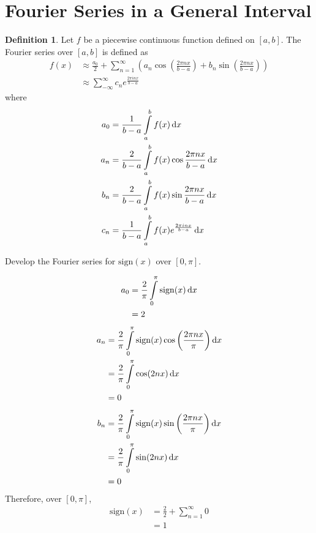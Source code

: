 \documentclass[fleqn, a4paper, 12pt, twoside]{article}
\theoremstyle{definition}
\newtheorem{definition}{Definition}
\theoremstyle{theorem}
\begin{document}
\section{Fourier Series in a General Interval}

\begin{definition}
	Let $f$ be a piecewise continuous function defined on $[a,b]$.
	The Fourier series over $[a,b]$ is defined as
	\begin{align*}
		f(x) & \approx \frac{a_0}{2} + \sum\limits_{n = 1}^{\infty} \left( a_n \cos\left( \frac{2 \pi n x}{b - a} \right) + b_n \sin\left( \frac{2 \pi n x}{b - a} \right) \right) \\
                     & \approx \sum\limits_{-\infty}^{\infty} c_n e^{\frac{2 \pi i n x}{b - a}}
	\end{align*}
	where
	\begin{align*}
		a_0 & = \frac{1}{b - a} \int\limits_{a}^{b} f(x) \dif x                              \\
		a_n & = \frac{2}{b - a} \int\limits_{a}^{b} f(x) \cos \frac{2 \pi n x}{b - a} \dif x \\
		b_n & = \frac{2}{b - a} \int\limits_{a}^{b} f(x) \sin \frac{2 \pi n x}{b - a} \dif x \\
		c_n & = \frac{1}{b - a} \int\limits_{a}^{b} f(x) e^{\frac{2 \pi i n x}{b - a}} \dif x
	\end{align*}
\end{definition}

\begin{question}
	Develop the Fourier series for $\mathrm{sign}(x)$ over $[0,\pi]$.
\end{question}

\begin{solution}
	\begin{align*}
		a_0 & = \frac{2}{\pi} \int\limits_{0}^{\pi} \mathrm{sign}(x) \dif x \\
                    & = 2
	\end{align*}
	\begin{align*}
		a_n & = \frac{2}{\pi} \int\limits_{0}^{\pi} \mathrm{sign}(x) \cos\left( \frac{2 \pi n x}{\pi} \right) \dif x \\
                    & = \frac{2}{\pi} \int\limits_{0}^{\pi} \cos(2 n x) \dif x                                               \\
                    & = 0
	\end{align*}
	\begin{align*}
		b_n & = \frac{2}{\pi} \int\limits_{0}^{\pi} \mathrm{sign}(x) \sin\left( \frac{2 \pi n x}{\pi} \right) \dif x \\
                    & = \frac{2}{\pi} \int\limits_{0}^{\pi} \sin(2 n x) \dif x                                               \\
                    & = 0
	\end{align*}
	Therefore, over $[0,\pi]$,
	\begin{align*}
		\mathrm{sign}(x) & = \frac{2}{2} + \sum\limits_{n = 1}^{\infty} 0 \\
                                 & = 1
	\end{align*}
\end{solution}
\end{document}
